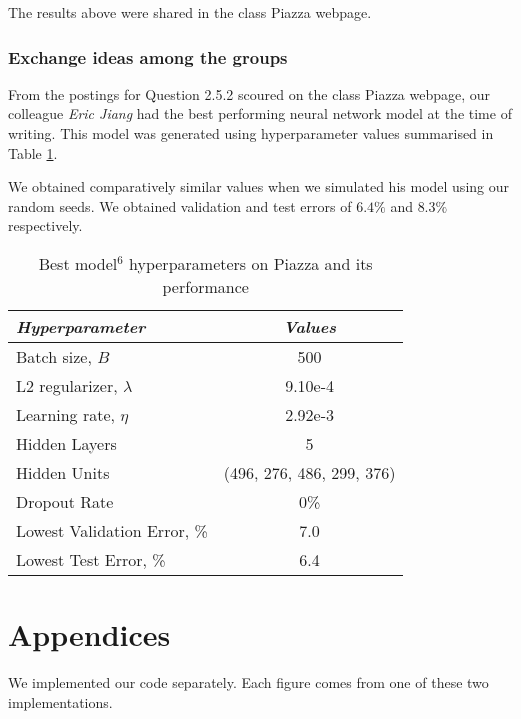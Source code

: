 \documentclass[a4paper,12pt]{article}
\begin{document}
The results above were shared in the class Piazza webpage.

\clearpage
\subsubsection{Exchange ideas among the groups}

From the postings for Question 2.5.2 scoured on the class Piazza webpage, our colleague \textit{Eric Jiang} had the best performing neural network model at the time of writing. This model was generated using hyperparameter values summarised in Table \ref{table:NN_ExchangeIdeas}. 

We obtained comparatively similar values when we simulated his model using our random seeds. We obtained validation and test errors of $6.4\%$ and $8.3\%$ respectively.

\begin{table}[!htb]
\centering
\caption{Best model$^6$ hyperparameters on Piazza and its performance}
\label{table:NN_ExchangeIdeas}
\vspace{0.5em}
\begin{tabular}{|l|c|} \hline
\textit{Hyperparameter} & \textit{Values} \\ \hline
Batch size, $B$ & 500 \\
L2 regularizer, $\lambda$ & 9.10e-4  \\
Learning rate, $\eta$ & 2.92e-3 \\
Hidden Layers & 5 \\
Hidden Units & (496, 276, 486, 299, 376) \\
Dropout Rate & 0\% \\
\hline
\small{Lowest Validation Error, \%} & 7.0 \\
Lowest Test Error, \% & 6.4 \\
\hline
\end{tabular}
\end{table}

\clearpage
\section{Appendices}

We implemented our code separately. Each figure comes from one of these two implementations. 
\end{document}
